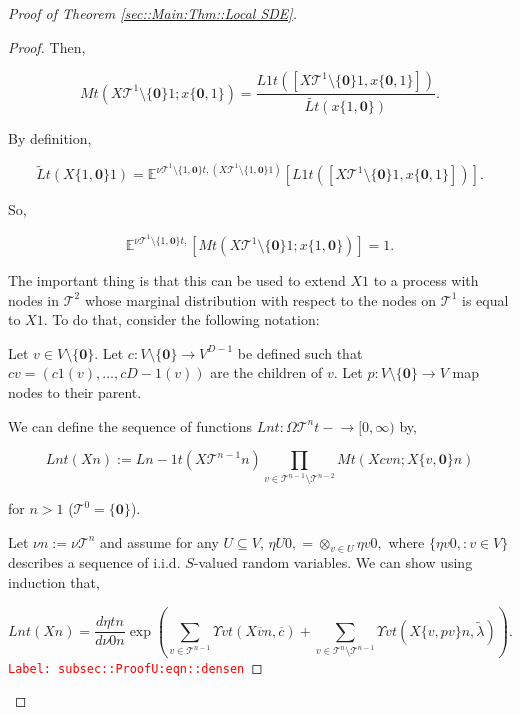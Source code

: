 \documentclass[12pt]{article}
\newcommand{\mb}{\mathbb}
\newcommand{\mc}{\mathcal}
\newcommand{\ra}{\rightarrow}
\newcommand{\ov}{\overline}
\newcommand{\tr}{\textcolor{red}}
\newcommand{\labe}[1]{\tr{\texttt{Label: #1}}}
\newcommand{\ind}{\hspace{24pt}}
\newcommand{\exmu}[2]{\mb{E}^{#1}\left[#2\right]}	%
\newcommand{\defeq}{:=}								%
\renewcommand{\root}{\mathbf{0}}				%
\renewcommand{\v}{v}							%
\renewcommand{\U}{U}							%
\renewcommand{\S}{S}							%
\newcommand{\x}{x}								%
\renewcommand{\t}{t}							%
\newcommand{\X}{X}								%
\newcommand{\cl}{\ov}							%
\newcommand{\degr}{D}							%
\newcommand{\IGrg}{\ov{c}}						%
\newcommand{\tree}{\mc{T}}						%
\newcommand{\sln}[1]{^{#1}}						%
\newcommand{\alt}[1]{\widetilde{#1}}			%
\newcommand{\mm}{\nu}							%
\newcommand{\mmm}{\eta}							%
\newcommand{\crate}{\alt{\lambda}}				%
\newcommand{\dense}{L}							%
\newcommand{\cdense}{M}							%
\newcommand{\ds}{\Upsilon}						%
\renewcommand{\c}{c}							%
\newcommand{\p}{p}								%
\begin{document}
\begin{proof}[Proof of Theorem \ref{sec::Main:Thm::Local SDE}]
\begin{proof}
Then,

\[\cdense{}{\t}(\X{\tree\sln{1}\setminus\{\root\}}{}{1};\x{\{\root,1\}}{}) = \frac{\dense{1}{\t}([\X{\tree\sln{1}\setminus\{\root\}}{}{1},\x{\{\root,1\}}{}])}{\alt{\dense{}{\t}}(\x{\{1,\root\}}{})}.\]

By definition,

\[\alt{\dense}{}{\t}(\X{\{1,\root\}}{}{1}) = \exmu{\mm{\tree\sln{1}\setminus\{1,\root\}}{\t,}{}(\X{\tree\sln{1}\setminus\{1,\root\}}{}{1})}{\dense{1}{\t}([\X{\tree\sln{1}\setminus\{\root\}}{}{1},\x{\{\root,1\}}{}])}.\]

So,

\[\exmu{\mm{\tree\sln{1}\setminus\{1,\root\}}{\t,}{}}{\cdense{}{\t}(\X{\tree\sln{1}\setminus\{\root\}}{}{1};\x{\{1,\root\}}{})} = 1.\]

The important thing is that this can be used to extend \(\X{}{}{1}\) to a process with nodes in \(\tree\sln{2}\) whose marginal distribution with respect to the nodes on \(\tree\sln{1}\) is equal to \(\X{}{}{1}\). To do that, consider the following notation:

\ind Let \(\v \in  V\setminus\{\root\}\). Let \(\c{}: V\setminus\{\root\} \ra  V^{\degr-1}\) be defined such that \(\c{\v} = (\c{1}(\v),\dots,\c{\degr-1}(\v))\) are the children of \(\v\). Let \(\p{}: V\setminus\{\root\}\ra V\) map nodes to their parent.

\ind We can define the sequence of functions \(\dense{n}{\t}: \Omega{\tree\sln{n}}{\t-} \ra [0,\infty)\) by,

\[\dense{n}{\t}(\X{}{}{n}) := \dense{n-1}{\t}(\X{\tree\sln{n-1}}{}{n})\prod_{\v\in \tree\sln{n-1}\setminus\tree\sln{n-2}} \cdense{}{\t}(\X{\c{\v}}{}{n};\X{\{\v,\root\}}{}{n})\]

for \(n > 1\) (\(\tree\sln{0} = \{\root\}\)). 

\ind Let \(\mm{}{}{n}\defeq \mm{\tree\sln{n}}{}{}\) and assume for any \(\U \subseteq  V\), \(\mmm{\U}{0,}{} = \otimes_{\v\in\U}\mmm{\v}{0,}{}\) where \(\{\mmm{\v}{0,}{}:\v\in V\}\) describes a sequence of i.i.d. \(\S\)-valued random variables. We can show using induction that,

\begin{equation}
\dense{n}{\t}(\X{}{}{n}) = \frac{d\mmm{}{\t}{n}}{d\mm{}{0}{n}}\exp\left(\sum_{\v\in\tree\sln{n-1}}\ds{\v}{\t}(\X{\cl{\v}}{}{n},\IGrg{}) + \sum_{\v\in\tree\sln{n}\setminus\tree\sln{n-1}} \ds{\v}{\t}(\X{\{v,\p{\v}\}}{}{n},\crate{}{})\right).
\label{subsec::ProofU:eqn::densen}
\end{equation}
\labe{subsec::ProofU:eqn::densen}


\end{proof}
\end{proof}
\end{document}
